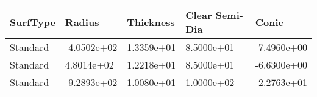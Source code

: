 \documentclass[convert={convertexe={magick.exe}}]{standalone}
\begin{document}
\begin{tabular}{lllll}
\toprule
SurfType &      Radius &  Thickness &  Clear Semi-Dia &       Conic \\
\midrule
Standard & -4.0502e+02 & 1.3359e+01 &      8.5000e+01 & -7.4960e+00 \\
Standard &  4.8014e+02 & 1.2218e+01 &      8.5000e+01 & -6.6300e+00 \\
Standard & -9.2893e+02 & 1.0080e+01 &      1.0000e+02 & -2.2763e+01 \\
\bottomrule
\end{tabular}
\end{document}
